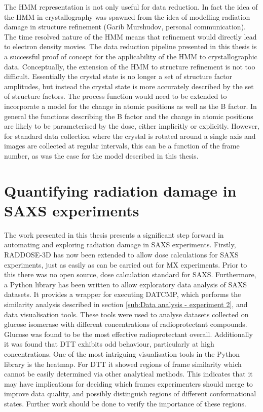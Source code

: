 The HMM representation is not only useful for data reduction.
In fact the idea of the HMM in crystallography was spawned from the idea of modelling radiation damage in structure refinement (Garib Murshudov, personal communication).
The time resolved nature of the HMM means that refinement would directly lead to electron density movies.
The data reduction pipeline presented in this thesis is a successful proof of concept for the applicability of the HMM to crystallographic data.
Conceptually, the extension of the HMM to structure refinement is not too difficult.
Essentially the crystal state is no longer a set of structure factor amplitudes, but instead the crystal state is more accurately described by the set of structure factors.
The process function would need to be extended to incorporate a model for the change in atomic positions as well as the B factor.
In general the functions describing the B factor and the change in atomic positions are likely to be parameterised by the dose, either implicitly or explicitly.
However, for standard data collection where the crystal is rotated around a single axis and images are collected at regular intervals, this can be a function of the frame number, as was the case for the model described in this thesis.

\section{Quantifying radiation damage in SAXS experiments}
\label{sec:Quantifying radiation damage in SAXS experiments}
The work presented in this thesis presents a significant step forward in automating and exploring radiation damage in SAXS experiments.
Firstly, RADDOSE-3D has now been extended to allow dose calculations for SAXS experiments, just as easily as can be carried out for MX experiments.
Prior to this there was no open source, dose calculation standard for SAXS.
Furthermore, a Python library has been written to allow exploratory data analysis of SAXS datasets.
It provides a wrapper for executing DATCMP, which performs the similarity analysis described in section \ref{sub:Data analysis - experiment 2}, and data visualisation tools.
These tools were used to analyse datasets collected on glucose isomerase with different concentrations of radioprotectant compounds.
Glucose was found to be the most effective radioprotectant overall.
Additionally it was found that DTT exhibits odd behaviour, particularly at high concentrations.
One of the most intriguing visualisation tools in the Python library is the heatmap.
For DTT it showed regions of frame similarity which cannot be easily determined via other analytical methods.
This indicates that it may have implications for deciding which frames experimenters should merge to improve data quality, and possibly distinguish regions of different conformational states.
Further work should be done to verify the importance of these regions.
